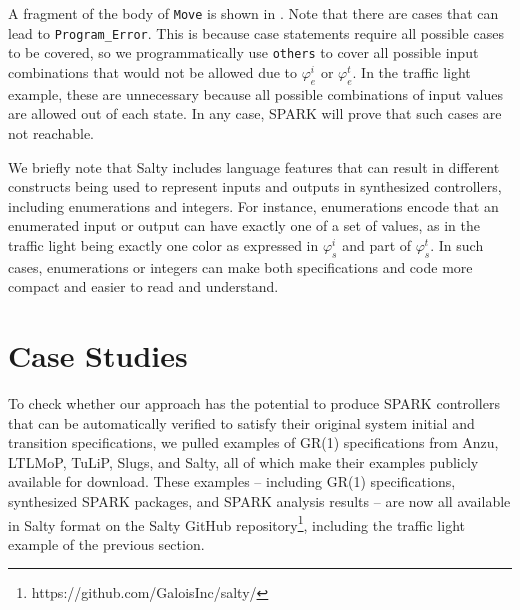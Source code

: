 \documentclass[runningheads]{llncs}
\begin{document}
A fragment of the body of \lstinline{Move} is shown in . 
Note that there are cases that can lead to \lstinline{Program_Error}. 
This is because case statements require all possible cases to be covered, so 
we programmatically use \lstinline{others} to cover all possible input combinations 
that would not be allowed due to $\varphi_e^i$ or $\varphi_e^t$. 
In the traffic light example, these are unnecessary because all possible combinations of input values are 
allowed out of each state. 
In any case, SPARK will prove that such cases are not reachable. 

We briefly note that Salty includes language features that can result in different constructs being used 
to represent inputs and outputs in synthesized controllers, 
including enumerations and integers. 
For instance, enumerations encode that an enumerated input or output can have exactly one of a set of values, 
as in the traffic light being exactly one color as expressed in $\varphi_s^i$ and part  of $\varphi_s^t$. 
In such cases, enumerations or integers can make both specifications and code more compact and easier to read and understand.

\section{Case Studies}
\label{sec:caseStudies}

To check whether our approach has the potential to produce SPARK controllers that can be automatically verified to satisfy their original system initial and transition specifications, 
we pulled examples of GR(1) specifications from Anzu, LTLMoP, TuLiP, Slugs, and Salty, all of which make their examples publicly available for download. 
These examples -- including GR(1) specifications, synthesized SPARK packages, and SPARK analysis results -- are now all available in Salty format on the 
Salty GitHub repository\footnote{https://github.com/GaloisInc/salty/}, including the traffic light example of the previous section. 
\end{document}
